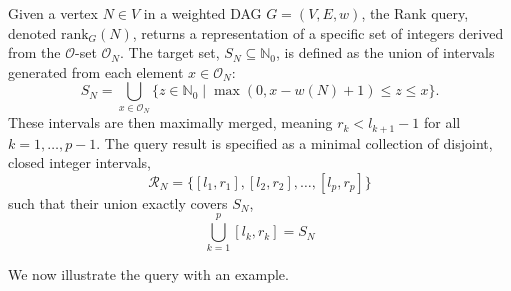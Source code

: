 \begin{definition}
    \label{def:rank_dag}
    Given a vertex $N \in V$ in a weighted DAG $G=(V, E, w)$, the Rank query, denoted $\mathrm{rank}_G(N)$, returns a representation of a specific set of integers derived from the $\mathcal{O}$-set $\mathcal{O}_N$. The target set, $S_N \subseteq \mathbb{N}_0$, is defined as the union of intervals generated from each element $x \in \mathcal{O}_N$:
    \[ S_N = \bigcup_{x \in \mathcal{O}_N} \{ z \in \mathbb{N}_0 \mid \max(0, x - w(N) + 1) \le z \le x \}. \]
    These intervals are then maximally merged, meaning $r_k < l_{k+1}-1$ for all $k=1, \dots, p-1$. The query result is specified as a minimal collection of disjoint, closed integer intervals,
    \[ \mathcal{R}_N = \{[l_1, r_1], [l_2, r_2], \dots, [l_p, r_p]\} \]
    such that their union exactly covers $S_N$,
    \[ \bigcup_{k=1}^{p} [l_k, r_k] = S_N \]
\end{definition}


We now illustrate the \Rank query with an example.

